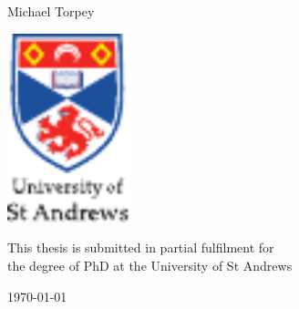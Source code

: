 \begin{titlepage}
  \centering

  \null
  \vspace{2em}

  {\Huge \textsc{\printtitle} \par}
  \vspace{7em}

  {\huge Michael Torpey}
  \vspace{6em}

  \includegraphics[height=14.8em,keepaspectratio,clip=true]{pics/arms}
  \vspace{6em}

  {\large This thesis is submitted in partial fulfilment for \\
    the degree of PhD at the University of St Andrews \par}
  \vspace{7em}

  {\Large \today}
\end{titlepage}
